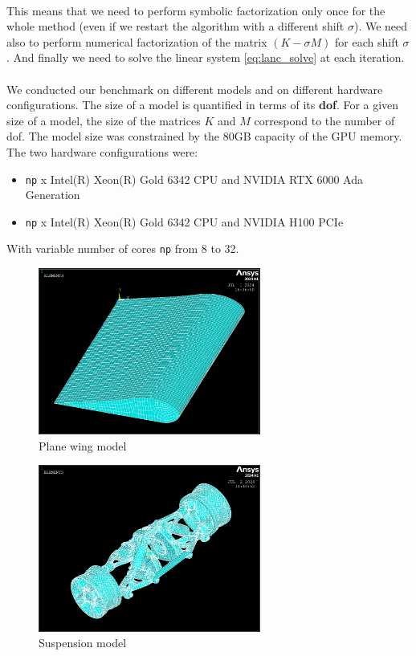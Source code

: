 \paragraph*{}
This means that we need to perform symbolic factorization only once for the whole method (even if we restart the algorithm with a different shift $\sigma$). We need also to perform numerical factorization of the matrix $(K-\sigma M)$ for each shift $\sigma$. And finally we need to solve the linear system \eqref{eq:lanc_solve} at each iteration.

\paragraph*{}
We conducted our benchmark on different models and on different hardware configurations. The size of a model is quantified in terms of its \textbf{\acrfull{dof}}. For a given size of a model, the size of the matrices $K$ and $M$ correspond  to the number of \acrshort{dof}. The model size was constrained by the 80GB capacity of the GPU memory. The two hardware configurations were:
\begin{itemize}
    \item \texttt{np} x Intel(R) Xeon(R) Gold 6342 CPU and NVIDIA RTX 6000 Ada Generation
    \item \texttt{np} x Intel(R) Xeon(R) Gold 6342 CPU and NVIDIA H100 PCIe
\end{itemize}
With variable number of cores \texttt{np} from 8 to 32.

\begin{figure}[h!]
\includegraphics[width=0.65\textwidth]{assets/figures/wing.png}
\centering
\caption{Plane wing model}
\label{fig:wing}
\end{figure}

\begin{figure}[h!]
\includegraphics[width=0.65\textwidth]{assets/figures/suspension.png}
\centering
\caption{Suspension model}
\label{fig:suspension}
\end{figure}

